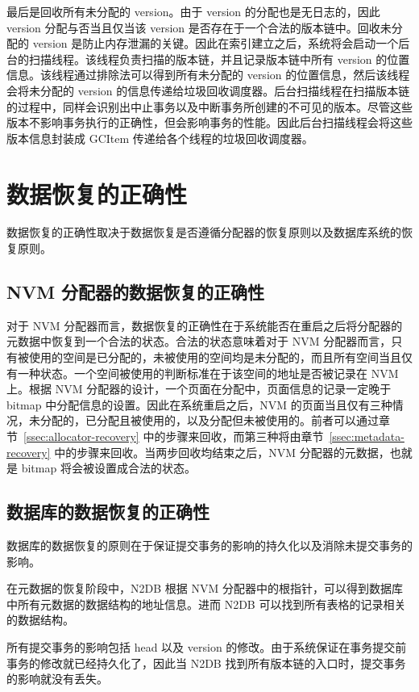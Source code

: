 最后是回收所有未分配的 version。由于 version 的分配也是无日志的，因此 version 分配与否当且仅当该 version 是否存在于一个合法的版本链中。回收未分配的 version 是防止内存泄漏的关键。因此在索引建立之后，系统将会启动一个后台的扫描线程。该线程负责扫描的版本链，并且记录版本链中所有 version 的位置信息。该线程通过排除法可以得到所有未分配的 version 的位置信息，然后该线程会将未分配的 version 的信息传递给垃圾回收调度器。后台扫描线程在扫描版本链的过程中，同样会识别出中止事务以及中断事务所创建的不可见的版本。尽管这些版本不影响事务执行的正确性，但会影响事务的性能。因此后台扫描线程会将这些版本信息封装成 GCItem 传递给各个线程的垃圾回收调度器。



\section{数据恢复的正确性}

数据恢复的正确性取决于数据恢复是否遵循分配器的恢复原则以及数据库系统的恢复原则。

\subsection{NVM 分配器的数据恢复的正确性}

对于 NVM 分配器而言，数据恢复的正确性在于系统能否在重启之后将分配器的元数据中恢复到一个合法的状态。合法的状态意味着对于 NVM 分配器而言，只有被使用的空间是已分配的，未被使用的空间均是未分配的，而且所有空间当且仅有一种状态。一个空间被使用的判断标准在于该空间的地址是否被记录在 NVM 上。根据 NVM 分配器的设计，一个页面在分配中，页面信息的记录一定晚于 bitmap 中分配信息的设置。因此在系统重启之后，NVM 的页面当且仅有三种情况，未分配的，已分配且被使用的，以及分配但未被使用的。前者可以通过章节~\ref{ssec:allocator-recovery} 中的步骤来回收，而第三种将由章节~\ref{ssec:metadata-recovery} 中的步骤来回收。当两步回收均结束之后，NVM 分配器的元数据，也就是 bitmap 将会被设置成合法的状态。

\subsection{数据库的数据恢复的正确性}

数据库的数据恢复的原则在于保证提交事务的影响的持久化以及消除未提交事务的影响。

在元数据的恢复阶段中，N2DB 根据 NVM 分配器中的根指针，可以得到数据库中所有元数据的数据结构的地址信息。进而 N2DB 可以找到所有表格的记录相关的数据结构。

所有提交事务的影响包括 head 以及 version 的修改。由于系统保证在事务提交前事务的修改就已经持久化了，因此当 N2DB 找到所有版本链的入口时，提交事务的影响就没有丢失。


